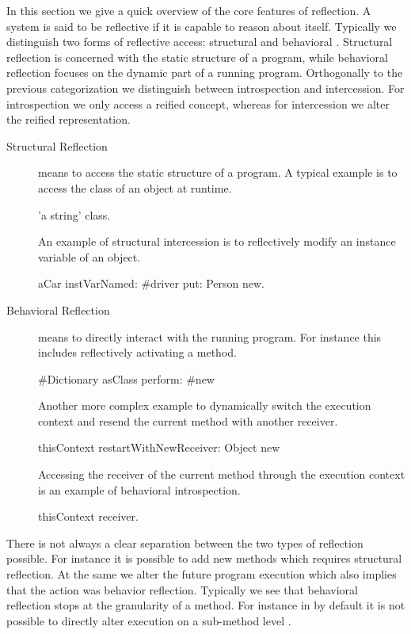 In this section we give a quick overview of the core features of reflection.
A system is said to be reflective if it is capable to reason about itself.
Typically we distinguish two forms of reflective access: structural and behavioral \cite{Maes87a}.
Structural reflection is concerned with the static structure of a program, while behavioral reflection focuses on the dynamic part of a running program.
Orthogonally to the previous categorization we distinguish between introspection and intercession. 
For introspection we only access a reified concept, whereas for intercession we alter the reified representation.

\begin{description}
\item[Structural Reflection] means to access the static structure of a program.
A typical example is to access the class of an object at runtime.
\begin{stcode}{}
'a string' class.
\end{stcode}
An example of structural intercession is to reflectively modify an instance variable of an object.
\begin{stcode}{}
aCar instVarNamed: #driver put: Person new.
\end{stcode}

\item[Behavioral Reflection] means to directly interact with the running program.
For instance this includes reflectively activating a method.
\begin{stcode}{}
#Dictionary asClass perform: #new
\end{stcode}
%
Another more complex example to dynamically switch the execution context and resend the current method with another receiver.
\begin{stcode}{}
thisContext restartWithNewReceiver: Object new 
\end{stcode}

Accessing the receiver of the current method through the execution context is an example of behavioral introspection.
\begin{stcode}{}
thisContext receiver. 
\end{stcode}
\end{description}

\noindent There is not always a clear separation between the two types of reflection possible.
For instance it is possible to add new methods which requires structural reflection.
At the same we alter the future program execution which also implies that the action was behavior reflection.
Typically we see that behavioral reflection stops at the granularity of a method.
For instance in \PH by default it is not possible to directly alter execution on a sub-method level \cite{Denk06a}.

